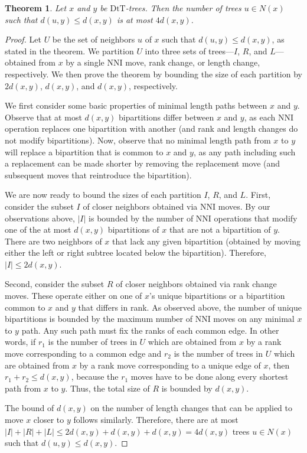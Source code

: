 \documentclass{amsart}
\newtheorem{theorem}[lemma]{Theorem}
\newcommand{\dts}{\mathrm{DtT}}
\begin{document}
\begin{theorem}
\label{max_good_neighbors}
Let $x$ and $y$ be $\dts$-trees.
Then the number of trees $u \in N(x)$ such that $d(u, y) \le d(x, y)$ is at most $4d(x,y)$.
\end{theorem}
\begin{proof}
Let $U$ be the set of neighbors $u$ of $x$ such that $d(u,y) \le d(x,y)$, as stated in the theorem.
We partition $U$ into three sets of trees---$I$, $R$, and $L$---obtained from $x$ by a single NNI move, rank change, or length change, respectively.
We then prove the theorem by bounding the size of each partition by $2d(x,y)$, $d(x,y)$, and $d(x,y)$, respectively.

We first consider some basic properties of minimal length paths between $x$ and $y$.
Observe that at most $d(x,y)$ bipartitions differ between $x$ and $y$, as each NNI operation replaces one bipartition with another (and rank and length changes do not modify bipartitions).
Now, observe that no minimal length path from $x$ to $y$ will replace a bipartition that is common to $x$ and $y$, as any path including such a replacement can be made shorter by removing the replacement move (and subsequent moves that reintroduce the bipartition).

We are now ready to bound the sizes of each partition $I$, $R$, and $L$.
First, consider the subset $I$ of closer neighbors obtained via NNI moves.
By our observations above, $|I|$ is bounded by the number of NNI operations that modify one of the at most $d(x,y)$ bipartitions of $x$ that are not a bipartition of $y$.
There are two neighbors of $x$ that lack any given bipartition (obtained by moving either the left or right subtree located below the bipartition).
Therefore, $|I| \le 2d(x,y)$.

Second, consider the subset $R$ of closer neighbors obtained via rank change moves.
These operate either on one of $x$'s unique bipartitions or a bipartition common to $x$ and $y$ that differs in rank.
As observed above, the number of unique bipartitions is bounded by the maximum number of NNI moves on any minimal $x$ to $y$ path.
Any such path must fix the ranks of each common edge.
In other words, if $r_1$ is the number of trees in $U$ which are obtained from $x$ by a rank move corresponding to a common edge and $r_2$ is the number of trees in $U$ which are obtained from $x$ by a rank move corresponding to a unique edge of $x$, then $r_1 + r_2 \leq d(x,y)$, because the $r_1$ moves have to be done along every shortest path from $x$ to $y$.
Thus, the total size of $R$ is bounded by $d(x,y)$.

The bound of $d(x,y)$ on the number of length changes that can be applied to move $x$ closer to $y$ follows similarly.
Therefore, there are at most $|I| + |R| + |L| \le 2d(x,y) + d(x,y) + d(x,y) = 4d(x,y)$ trees $u \in N(x)$ such that $d(u, y) \le d(x, y)$.
\end{proof}
\end{document}
